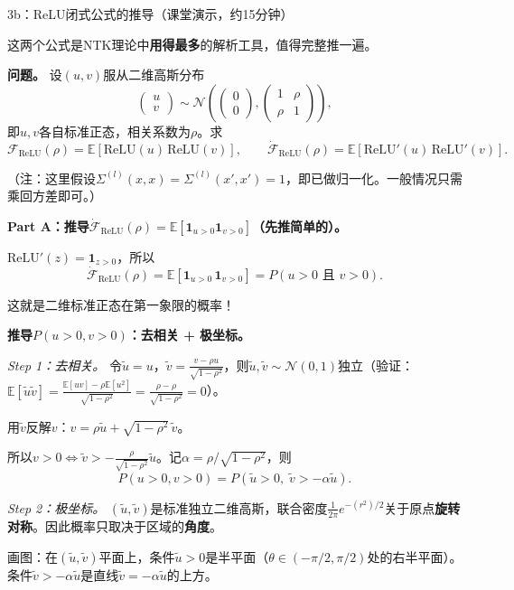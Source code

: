 \documentclass[11pt,a4paper]{article}
\newcommand{\E}{\mathbb{E}}
\newcommand{\cN}{\mathcal{N}}
\begin{document}
\begin{handcalc}{3b：ReLU闭式公式的推导（课堂演示，约15分钟）}

这两个公式是NTK理论中\textbf{用得最多}的解析工具，值得完整推一遍。

\textbf{问题。} 设$(u,v)$服从二维高斯分布
\[
\begin{pmatrix}u\\v\end{pmatrix}\sim\cN\!\left(\begin{pmatrix}0\\0\end{pmatrix},\begin{pmatrix}1&\rho\\\rho&1\end{pmatrix}\right),
\]
即$u,v$各自标准正态，相关系数为$\rho$。求
\[
\mathcal{F}_{\text{ReLU}}(\rho) = \E[\text{ReLU}(u)\,\text{ReLU}(v)], \qquad \dot{\mathcal{F}}_{\text{ReLU}}(\rho) = \E[\text{ReLU}'(u)\,\text{ReLU}'(v)].
\]

（注：这里假设$\Sigma^{(l)}(x,x)=\Sigma^{(l)}(x',x')=1$，即已做归一化。一般情况只需乘回方差即可。）

\tcblower

\textbf{Part A：推导$\dot{\mathcal{F}}_{\text{ReLU}}(\rho) = \E[\mathbf{1}_{u>0}\mathbf{1}_{v>0}]$（先推简单的）。}

$\text{ReLU}'(z)=\mathbf{1}_{z>0}$，所以
\[
\dot{\mathcal{F}}_{\text{ReLU}}(\rho) = \E[\mathbf{1}_{u>0}\,\mathbf{1}_{v>0}] = P(u>0 \text{ 且 } v>0).
\]

这就是二维标准正态在第一象限的概率！

\textbf{推导$P(u>0,v>0)$：去相关 + 极坐标。}

\textit{Step 1：去相关。} 令$\tilde u = u$，$\tilde v = \frac{v-\rho u}{\sqrt{1-\rho^2}}$，则$\tilde u, \tilde v\sim\cN(0,1)$独立（验证：$\E[\tilde u\tilde v]=\frac{\E[uv]-\rho\E[u^2]}{\sqrt{1-\rho^2}}=\frac{\rho-\rho}{\sqrt{1-\rho^2}}=0$）。

用$\tilde v$反解$v$：$v = \rho\tilde u + \sqrt{1-\rho^2}\,\tilde v$。

所以$v>0 \Leftrightarrow \tilde v > -\frac{\rho}{\sqrt{1-\rho^2}}\tilde u$。记$\alpha = \rho/\sqrt{1-\rho^2}$，则
\[
P(u>0,v>0) = P(\tilde u>0,\;\tilde v > -\alpha\tilde u).
\]

\textit{Step 2：极坐标。} $(\tilde u, \tilde v)$是标准独立二维高斯，联合密度$\frac{1}{2\pi}e^{-(r^2)/2}$关于原点\textbf{旋转对称}。因此概率只取决于区域的\textbf{角度}。

画图：在$(\tilde u, \tilde v)$平面上，条件$\tilde u>0$是半平面（$\theta\in(-\pi/2, \pi/2)$处的右半平面）。条件$\tilde v > -\alpha\tilde u$是直线$\tilde v = -\alpha\tilde u$的上方。


\end{handcalc}
\end{document}

